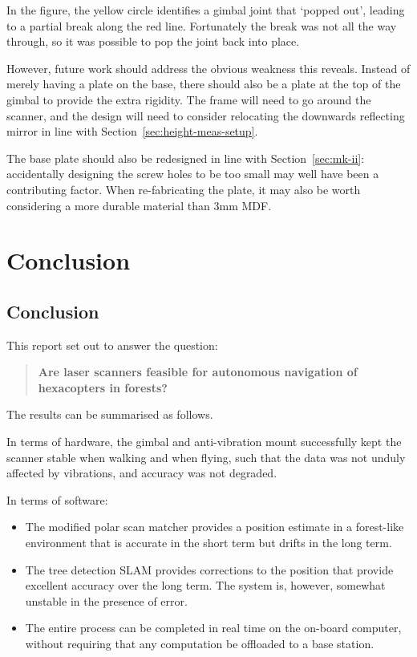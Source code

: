 \documentclass[12pt,oneside,a4paper]{book}
\begin{document}
In the figure, the yellow circle identifies a gimbal joint that
`popped out', leading to a partial break along the red
line. Fortunately the break was not all the way through, so it was
possible to pop the joint back into place.

However, future work should address the obvious weakness this
reveals. Instead of merely having a plate on the base, there should
also be a plate at the top of the gimbal to provide the extra
rigidity. The frame will need to go around the scanner, and the design
will need to consider relocating the downwards reflecting mirror in
line with Section~\ref{sec:height-meas-setup}.

The base plate should also be redesigned in line with
Section~\ref{sec:mk-ii}: accidentally designing the screw holes to be
too small may well have been a contributing factor. When re-fabricating
the plate, it may also be worth considering a more durable material
than 3mm MDF.

\part{Conclusion}
\chapter{Conclusion}
\label{cha:conclusion}


This report set out to answer the question: 
\begin{quote}
  \textbf{Are laser scanners feasible for autonomous navigation of
    hexacopters in forests?}
\end{quote}

The results can be summarised as follows.

In terms of hardware, the gimbal and anti-vibration mount successfully
kept the scanner stable when walking and when flying, such that the
data was not unduly affected by vibrations, and accuracy was not
degraded.

In terms of software:
\begin{itemize}
\item The modified polar scan matcher provides a position estimate in
  a forest-like environment that is accurate in the short term but
  drifts in the long term.
\item The tree detection SLAM provides corrections to the position
  that provide excellent accuracy over the long term. The system is,
  however, somewhat unstable in the presence of error.
\item The entire process can be completed in real time on the on-board
  computer, without requiring that any computation be offloaded to a
  base station.
\end{itemize}
\end{document}
